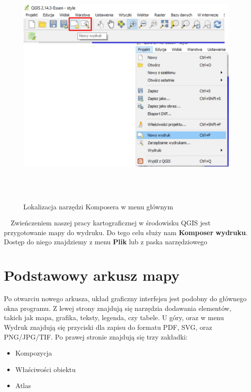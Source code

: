 \documentclass[12pt,a4paper]{book}
\begin{document}
\begin{center}
\begin{figure}
\includegraphics[width=15.797cm,height=12.464cm]{008-ikony.jpg}
\caption{Lokalizacja narzędzi Komposera w menu głównym}
\end{figure}
\end{center}
\ \ Zwieńczeniem naszej pracy kartograficznej w środowisku QGIS jest przygotowanie mapy do wydruku. Do tego celu służy nam \textbf{Komposer} \textbf{wydruku}. Dostęp do niego znajdziemy z menu\textbf{ Plik }lub z paska narzędziowego

\section{Podstawowy arkusz mapy}
Po otwarciu nowego arkusza, układ graficzny interfejsu jest podobny do głównego okna programu. Z lewej strony znajdują się narzędzia dodawania elementów, takich jak mapa, grafika, teksty, legenda, czy tabele. U góry, oraz w menu  Wydruk  znajdują się przyciski dla zapisu do formatu PDF, SVG, oraz PNG/JPG/TIF. Po prawej stronie znajdują się trzy zakładki:

\begin{itemize}
\item Kompozycja
\item Właściwości obiektu
\item Atlas
\end{itemize}
\end{document}
